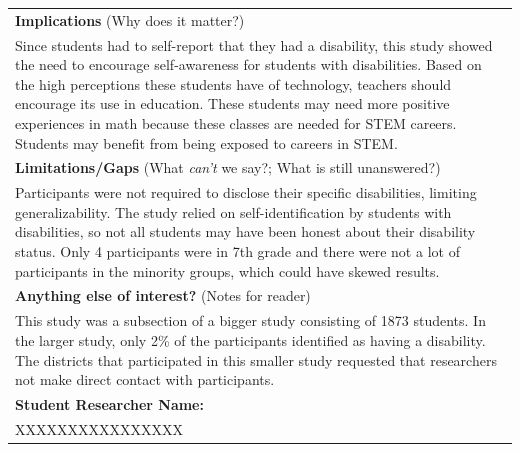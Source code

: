\documentclass[11.5pt]{sig-alternate}
\begin{document}
\begin{large}
\begin{table}
\begin{tabular}{|l|}
\textbf{Implications} (Why does it matter?) \\
Since students had to self-report that they had a disability, this study showed the need to encourage self-awareness for students with disabilities. Based on the high perceptions these students have of technology, teachers should encourage its use in education. These students may need more positive experiences in math because these classes are needed for STEM careers. Students may benefit from being exposed to careers in STEM. \\ \hline
\textbf{Limitations/Gaps} (What \textit{can't} we say?; What is still unanswered?) \\
Participants were not required to disclose their specific disabilities, limiting generalizability. The study relied on self-identification by students with disabilities, so not all students may have been honest about their disability status. Only 4 participants were in 7th grade and there were not a lot of participants in the minority groups, which could have skewed results. \\ \hline
\textbf{Anything else of interest?} (Notes for reader) \\
This study was a subsection of a bigger study consisting of 1873 students. In the larger study, only 2\% of the participants identified as having a disability. The districts that participated in this smaller study requested that researchers not make direct contact with participants. \\ \hline
\textbf{Student Researcher Name:} \\
XXXXXXXXXXXXXXXX \\ \hline
\end{tabular}
\end{table}


\end{large}
\end{document}
